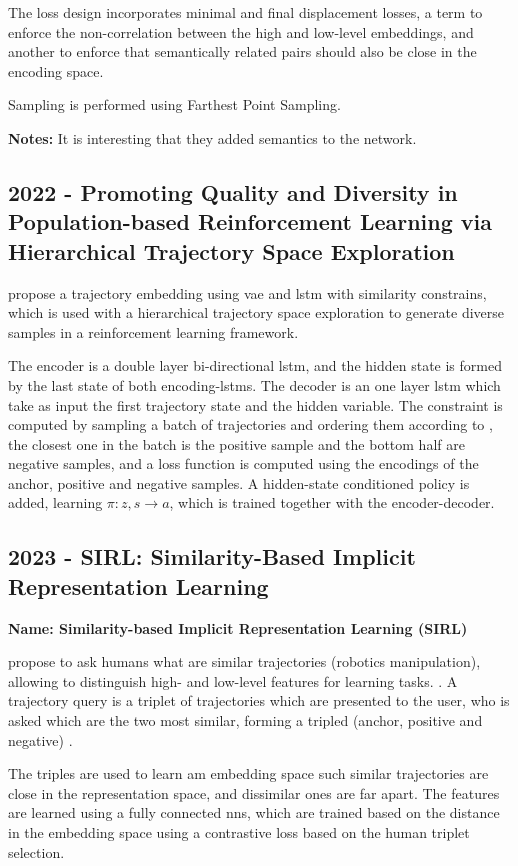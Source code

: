 The loss design incorporates minimal and final displacement losses, a term to enforce the non-correlation between the high and low-level embeddings, and another to enforce that semantically related pairs should also be close in the encoding space.

Sampling is performed using Farthest Point Sampling.

\textbf{Notes:} It is interesting that they added semantics to the network.

\subsection*{2022 - Promoting Quality and Diversity in Population-based Reinforcement Learning via Hierarchical Trajectory Space Exploration}

\cite{miao2022promoting} propose a trajectory embedding using \gls{vae} and \gls{lstm} with similarity constrains, which is used with a hierarchical trajectory space exploration to generate diverse samples in a reinforcement learning framework.

The encoder is a double layer bi-directional \gls{lstm}, and the hidden state is formed by the last state of both encoding-\glspl{lstm}.
%
The decoder is an one layer \gls{lstm} which take as input the first trajectory state and the hidden variable.
%
The constraint is computed by sampling a batch of trajectories and ordering them according to , the closest one in the batch is the positive sample and the bottom half are negative samples, and a loss function is computed using the encodings of the anchor, positive and negative samples.
%
A hidden-state conditioned  policy is added, learning $\pi:z, s \rightarrow a$, which is trained together with the encoder-decoder.

\subsection*{2023 - SIRL: Similarity-Based Implicit Representation Learning}

\textbf{Name: Similarity-based Implicit Representation Learning (SIRL)}

\cite{bobu2023sirl} propose to ask humans what are similar trajectories (robotics manipulation), allowing to distinguish high- and low-level features for learning tasks. .
%
A trajectory query is a triplet of trajectories which are presented to the user, who is asked which are the two most similar, forming a tripled (anchor, positive and negative) .

The triples are used to learn am embedding space such similar trajectories are close in the representation space, and dissimilar ones are far apart.
%
The features are learned using a fully connected \glspl{nn}, which are trained based on the distance in the embedding space using a contrastive loss based on the human triplet selection.
